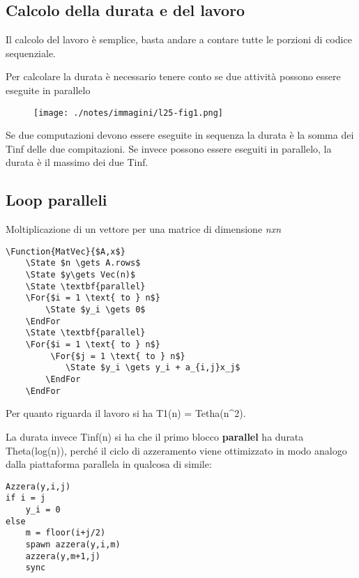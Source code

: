 
\subsection{Calcolo della durata e del lavoro}\label{calcolo-della-durata-e-del-lavoro}

Il calcolo del lavoro è semplice, basta andare a contare tutte le
porzioni di codice sequenziale.

Per calcolare la durata è necessario tenere conto se due attività
possono essere eseguite in parallelo

\begin{figure}[htbp]
\centering
\texttt{[image: ./notes/immagini/l25-fig1.png]}
\caption{}
\end{figure}

Se due computazioni devono essere eseguite in sequenza la durata è la
somma dei Tinf delle due compitazioni. Se invece possono essere eseguiti
in parallelo, la durata è il massimo dei due Tinf.

\subsection{Loop paralleli}\label{loop-paralleli}

Moltiplicazione di un vettore per una matrice di dimensione \emph{nxn}

\begin{verbatim}
\Function{MatVec}{$A,x$}
    \State $n \gets A.rows$
    \State $y\gets Vec(n)$
    \State \textbf{parallel}
    \For{$i = 1 \text{ to } n$}
        \State $y_i \gets 0$
    \EndFor
    \State \textbf{parallel}
    \For{$i = 1 \text{ to } n$}
         \For{$j = 1 \text{ to } n$}
            \State $y_i \gets y_i + a_{i,j}x_j$
        \EndFor
    \EndFor
\end{verbatim}

Per quanto riguarda il lavoro si ha T1(n) = Tetha(n\^{}2).

La durata invece Tinf(n) si ha che il primo blocco \textbf{parallel} ha
durata Theta(log(n)), perché il ciclo di azzeramento viene ottimizzato
in modo analogo dalla piattaforma parallela in qualcosa di simile:

\begin{verbatim}
Azzera(y,i,j)
if i = j
    y_i = 0
else 
    m = floor(i+j/2)
    spawn azzera(y,i,m)
    azzera(y,m+1,j)
    sync
\end{verbatim}

